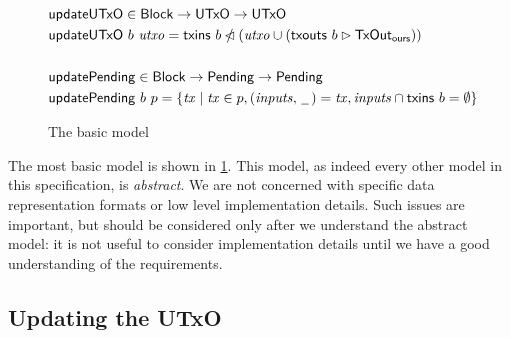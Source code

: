 \documentclass{article}
\newcommand{\restrictdom}{\lhd}
\newcommand{\subtractdom}{\mathbin{\slashed{\restrictdom}}}
\newcommand{\restrictrange}{\rhd}
\theoremstyle{definition}{
  \newtheorem{lemma}{Lemma}[section] %
  \newtheorem{definition}[lemma]{Definition}
}
\theoremstyle{theorem}{
  \newtheorem{invariant}[lemma]{Invariant}
  \newtheorem{proofobligation}[lemma]{Proof Obligation}
}
\numberwithin{equation}{lemma}
\begin{document}
\begin{figure}
\begin{align*}
\\
& \mathsf{updateUTxO} \in \mathsf{Block} \to \mathsf{UTxO} \to \mathsf{UTxO} \\
& \mathsf{updateUTxO} ~ b ~ \mathit{utxo} = \mathsf{txins} ~ b \subtractdom (\mathit{utxo} \cup (\mathsf{txouts} ~ b \restrictrange \mathsf{TxOut_{ours}})) \\
\\
& \mathsf{updatePending} \in \mathsf{Block} \to \mathsf{Pending} \to \mathsf{Pending} \\
& \mathsf{updatePending} ~ b ~ p = \{ \mathit{tx} \mid \mathit{tx} \in p, (\mathit{inputs}, \,\underline{\phantom{a}}\,) = \mathit{tx}, \mathit{inputs} \cap \mathsf{txins} ~ b = \emptyset \}
\end{align*}
%
\caption{\label{fig:basic_model}The basic model}
\end{figure}

The most basic model is shown in \cref{fig:basic_model}. This model, as
indeed every other model in this specification, is \emph{abstract}. We are not
concerned with specific data representation formats or low level implementation
details. Such issues are important, but should be considered only after we
understand the abstract model: it is not useful to consider implementation
details until we have a good understanding of the requirements.

\subsection{Updating the UTxO}
\end{document}
